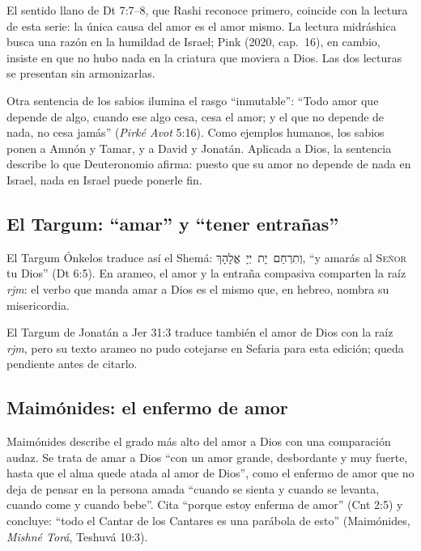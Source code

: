 \documentclass[11pt,letterpaper]{article}
\newcommand{\heb}[1]{\mbox{\foreignlanguage{hebrew}{#1}}}
\newcommand{\SENOR}{\textsc{Señor}}
\begin{document}
\begin{nota}[Precisión]
El sentido llano de Dt 7:7--8, que Rashi reconoce primero, coincide con la lectura de esta serie: la única causa del amor es el amor mismo. La lectura midráshica busca una razón en la humildad de Israel; Pink (2020, cap.~16), en cambio, insiste en que no hubo nada en la criatura que moviera a Dios. Las dos lecturas se presentan sin armonizarlas.
\end{nota}

Otra sentencia de los sabios ilumina el rasgo ``inmutable'': ``Todo amor que depende de algo, cuando ese algo cesa, cesa el amor; y el que no depende de nada, no cesa jamás'' (\emph{Pirké Avot} 5:16). Como ejemplos humanos, los sabios ponen a Amnón y Tamar, y a David y Jonatán. Aplicada a Dios, la sentencia describe lo que Deuteronomio afirma: puesto que su amor no depende de nada en Israel, nada en Israel puede ponerle fin.

\subsection{El Targum: ``amar'' y ``tener entrañas''}
El Targum Ónkelos traduce así el Shemá: \heb{וְתִרְחַם יָת יְיָ אֱלָהָךְ}, ``y amarás al \SENOR{} tu Dios'' (Dt 6:5). En arameo, el amor y la entraña compasiva comparten la raíz \emph{rjm}: el verbo que manda amar a Dios es el mismo que, en hebreo, nombra su misericordia.

\begin{nota}[Precisión]
El Targum de Jonatán a Jer 31:3 traduce también el amor de Dios con la raíz \emph{rjm}, pero su texto arameo no pudo cotejarse en Sefaria para esta edición; queda pendiente antes de citarlo.
\end{nota}

\subsection{Maimónides: el enfermo de amor}
Maimónides describe el grado más alto del amor a Dios con una comparación audaz. Se trata de amar a Dios ``con un amor grande, desbordante y muy fuerte, hasta que el alma quede atada al amor de Dios'', como el enfermo de amor que no deja de pensar en la persona amada ``cuando se sienta y cuando se levanta, cuando come y cuando bebe''. Cita ``porque estoy enferma de amor'' (Cnt 2:5) y concluye: ``todo el Cantar de los Cantares es una parábola de esto'' (Maimónides, \emph{Mishné Torá}, Teshuvá 10:3).
\end{document}
